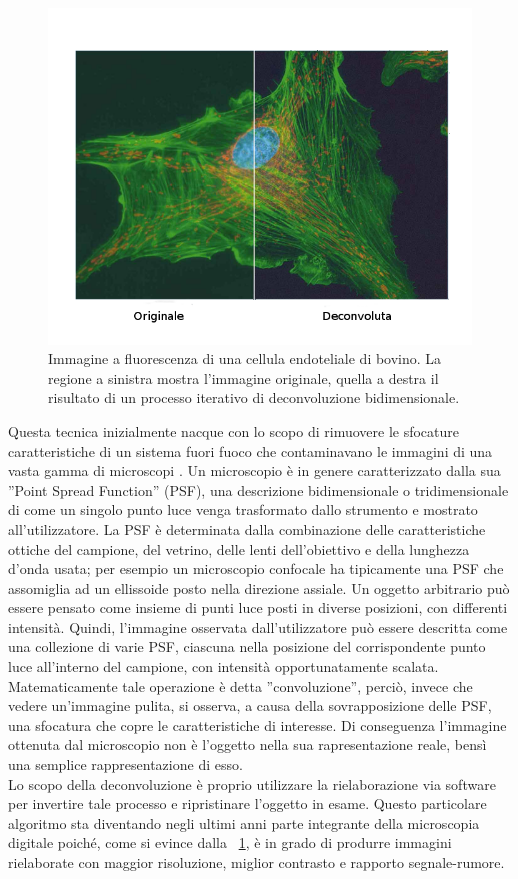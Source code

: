 \begin{figure}[!ht]
 \centering
 \includegraphics[scale=.40]{img/CAP2decon.png}
 \caption{\small{Immagine a fluorescenza di una cellula endoteliale di bovino. La regione a sinistra mostra l'immagine originale, quella a destra il risultato di un processo iterativo di deconvoluzione bidimensionale.}}
 \label{fig:decon}
\end{figure}

Questa  tecnica inizialmente nacque con lo scopo di rimuovere le sfocature caratteristiche di un sistema fuori fuoco che contaminavano le immagini di una vasta gamma di microscopi \cite{decon}. Un microscopio è in genere caratterizzato dalla sua ''Point Spread Function'' (PSF), una descrizione bidimensionale o tridimensionale di come un singolo punto luce venga trasformato dallo strumento e mostrato all'utilizzatore. La PSF è determinata dalla combinazione delle caratteristiche ottiche del campione, del vetrino, delle lenti dell'obiettivo e della lunghezza d'onda usata; per esempio un microscopio confocale ha tipicamente una PSF che assomiglia ad un ellissoide posto nella direzione assiale. Un oggetto arbitrario può essere pensato come insieme di punti luce posti in diverse posizioni, con differenti intensità. Quindi, l'immagine osservata dall'utilizzatore può essere descritta come una collezione di varie PSF, ciascuna nella posizione del corrispondente punto luce all'interno del campione, con intensità opportunatamente scalata. Matematicamente tale operazione è detta ''convoluzione'', perciò, invece che vedere un'immagine pulita, si osserva, a causa della sovrapposizione delle PSF, una sfocatura che copre le caratteristiche di interesse. Di conseguenza l'immagine ottenuta dal microscopio non è l'oggetto nella sua rapresentazione reale, bensì una semplice rappresentazione di esso. \\
Lo scopo della deconvoluzione è proprio utilizzare la rielaborazione via software per invertire tale processo e ripristinare l'oggetto in esame. Questo particolare algoritmo sta diventando negli ultimi anni parte integrante della microscopia digitale poiché, come si evince dalla \figurename~\ref{fig:decon}, è in grado di produrre immagini rielaborate con maggior risoluzione, miglior contrasto e rapporto segnale-rumore.


